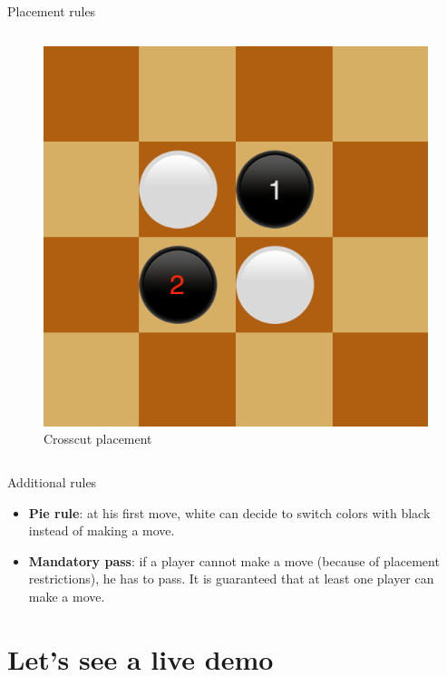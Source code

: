 \documentclass{beamer}
\begin{document}
\begin{frame}{Placement rules}
\begin{columns}
			\begin{figure}
				\includegraphics[scale=0.35]{images/crosscut.png}
				\caption*{Crosscut placement}
			\end{figure}
		
	\end{columns}
      \end{frame}
      
      \begin{frame}{Additional rules}
     \begin{itemize}
     \item \textbf{Pie rule}: at his first move, white can decide to switch colors with black instead of making a move.
     \item \textbf{Mandatory pass}: if a player cannot make a move (because of placement restrictions), he has to pass. It is guaranteed that at least one player can make a move.
     \end{itemize}
      \end{frame}
      
\section{Let's see a live demo}
      
      
      
\end{document}
